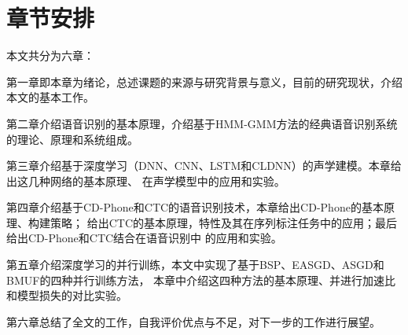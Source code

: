 \section{章节安排}

本文共分为六章：

第一章即本章为绪论，总述课题的来源与研究背景与意义，目前的研究现状，介绍本文的基本工作。

第二章介绍语音识别的基本原理，介绍基于HMM-GMM方法的经典语音识别系统的理论、原理和系统组成。

第三章介绍基于深度学习（DNN、CNN、LSTM和CLDNN）的声学建模。本章给出这几种网络的基本原理、
在声学模型中的应用和实验。

第四章介绍基于CD-Phone和CTC的语音识别技术，本章给出CD-Phone的基本原理、构建策略；
给出CTC的基本原理，特性及其在序列标注任务中的应用；最后给出CD-Phone和CTC结合在语音识别中
的应用和实验。

第五章介绍深度学习的并行训练，本文中实现了基于BSP、EASGD、ASGD和BMUF的四种并行训练方法，
本章中介绍这四种方法的基本原理、并进行加速比和模型损失的对比实验。

第六章总结了全文的工作，自我评价优点与不足，对下一步的工作进行展望。
